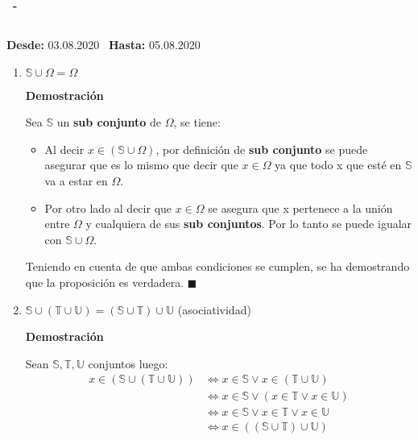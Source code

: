 \documentclass[a4paper,dvipsnames]{book}
\newcommand{\np}{\null\newpage}
\newenvironment{tarea}[3]
    {
        \null\newpage
        \begin{tcolorbox}
            \textbf{\asignatura\ -\ \autor}
            \subsection{\capitalisewords{#1}}

            \begin{flushright}
            \textbf{Desde:}  #2 \
            \textbf{Hasta:}  #3 \
            \end{flushright}
        \end{tcolorbox}

    \begin{enumerate}[{Ejercicio} 1.]
    }
    {
        \end{enumerate}
        \np
    }
\begin{document}
\begin{tarea}{Tarea Demostración de Lemas}{03.08.2020}{05.08.2020}
\begin{enumerate}
                Ya que ambas situaciones son verdaderas se a demostrado
                verdadera a la proposición. $\blacksquare$

                \item $\mathbb S\cup \Omega = \Omega$

                \textbf{Demostración}

                Sea $\mathbb S$ un \textbf{sub conjunto} de $\Omega$, se tiene:

                \begin{itemize}
                    \item Al decir $x\in\left( \mathbb S\cup\Omega \right)$,
                        por definición de \textbf{sub conjunto} se puede
                        asegurar que es lo mismo que decir que $x\in\Omega$ ya
                        que todo x que esté en $\mathbb S$ va a estar en
                        $\Omega$.
                    \item Por otro lado al decir que $x\in\Omega$ se asegura
                        que x pertenece a la unión entre $\Omega$ y cualquiera
                        de sus \textbf{sub conjuntos}. Por lo tanto se puede
                        igualar con $\mathbb S\cup\Omega$.
                \end{itemize}

            Teniendo en cuenta de que ambas condiciones se cumplen, se ha
            demostrando que la proposición es verdadera. $\blacksquare$
            \np
                \item $\mathbb S\cup(\mathbb T\cup  \mathbb U) = (\mathbb S\cup
                    \mathbb T)\cup \mathbb U$ (asociatividad)

                \textbf{Demostración}

                Sean $\mathbb S,\mathbb T,\mathbb U$ conjuntos luego:
                \begin{equation*}

                \begin{split}
                    x\in\left( \mathbb S\cup\left( \mathbb T\cup\mathbb U
                    \right) \right) & \iff x\in\mathbb S\lor x\in\left( \mathbb
                    T\cup\mathbb U\right)\\
                    & \iff x\in\mathbb S\lor \left( x\in\mathbb T\lor x
                    \in\mathbb U \right)\\
                    & \iff x\in\mathbb S\lor x\in\mathbb T\lor x \in\mathbb U\\
                    & \iff x\in\left( \left( \mathbb S\cup \mathbb T
                    \right)\cup\mathbb U \right)\\
                \end{split}
                \end{equation*}


\end{enumerate}
\end{tarea}
\end{document}
